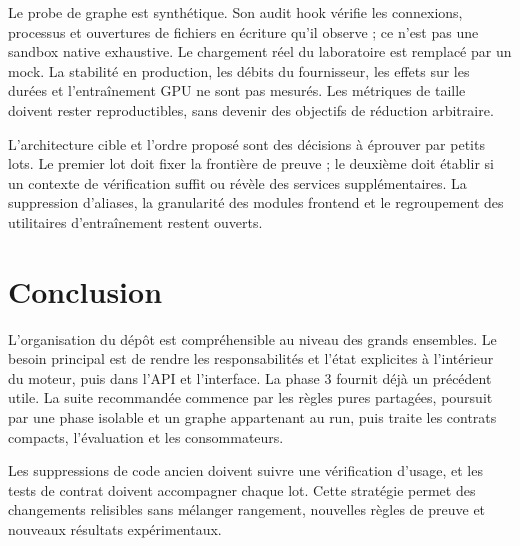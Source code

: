 \documentclass[11pt,a4paper]{article}
\begin{document}
Le probe de graphe est synthétique. Son audit hook vérifie les connexions,
processus et ouvertures de fichiers en écriture qu'il observe ; ce n'est pas
une sandbox native exhaustive. Le chargement réel du laboratoire est remplacé
par un mock. La stabilité en production, les débits du fournisseur, les effets
sur les durées et l'entraînement GPU ne sont pas mesurés. Les métriques de
taille doivent rester reproductibles, sans devenir des objectifs de réduction
arbitraire.

L'architecture cible et l'ordre proposé sont des décisions à éprouver par
petits lots. Le premier lot doit fixer la frontière de preuve ; le deuxième
doit établir si un contexte de vérification suffit ou révèle des services
supplémentaires. La suppression d'aliases, la granularité des modules frontend
et le regroupement des utilitaires d'entraînement restent ouverts.

\section{Conclusion}
L'organisation du dépôt est compréhensible au niveau des grands ensembles.
Le besoin principal est de rendre les responsabilités et l'état explicites
à l'intérieur du moteur, puis dans l'API et l'interface. La phase 3 fournit
déjà un précédent utile. La suite recommandée commence par les règles pures
partagées, poursuit par une phase isolable et un graphe appartenant au run,
puis traite les contrats compacts, l'évaluation et les consommateurs.

Les suppressions de code ancien doivent suivre une vérification d'usage,
et les tests de contrat doivent accompagner chaque lot. Cette stratégie
permet des changements relisibles sans mélanger rangement, nouvelles règles
de preuve et nouveaux résultats expérimentaux.
\end{document}
